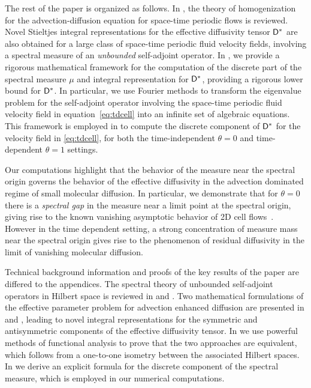 \documentclass[amsa]{ipart}
\begin{document}
The rest of the paper is organized as follows. In
, the theory of homogenization for the
advection-diffusion equation for space-time periodic flows is
reviewed. Novel Stieltjes integral representations for the effective
diffusivity tensor $\mathsf{D}^*$ are also obtained for a large class of
space-time periodic fluid velocity fields, involving a spectral
measure of an \emph{unbounded} self-adjoint operator. In
, we provide a rigorous mathematical
framework for the computation of the discrete part of the spectral
measure $\mu$ and integral representation for $\mathsf{D}^*$, providing a
rigorous lower bound for $\mathsf{D}^*$. In particular, we use
Fourier methods to transform the eigenvalue problem for the
self-adjoint operator involving the space-time periodic fluid velocity
field in equation~\eqref{eq:tdcell} into an infinite set of algebraic
equations. This framework is employed in  
to compute the discrete component of $\mathsf{D}^*$ for the velocity field in
\eqref{eq:tdcell}, for both the time-independent $\theta=0$ and
time-dependent $\theta=1$ settings.




Our computations highlight that the
behavior of the measure 
near the spectral origin governs the behavior of the effective
diffusivity in the advection dominated regime of small molecular
diffusion. In particular, we demonstrate that for $\theta=0$ there is a
\emph{spectral gap} in the measure near a limit point at the spectral
origin, giving rise to the known vanishing asymptotic behavior of 2D
cell
flows~\cite{Fannjiang:1994:SIAM_JAM:333,Novikov:2005:CPAM:867}. However
in the time dependent setting, a strong concentration of measure mass 
near the spectral origin gives rise to the phenomenon of residual
diffusivity in the limit of vanishing molecular diffusion.




Technical background information and proofs of the key results of the
paper are differed to the appendices. The spectral theory of unbounded
self-adjoint operators in Hilbert space is reviewed in 
 and . Two
mathematical formulations of the effective parameter problem for
advection enhanced diffusion are presented in
 and , leading
to novel integral representations for the symmetric and antisymmetric 
components of the effective diffusivity tensor. In
 we use powerful methods of
functional analysis to prove that the two approaches are equivalent,
which follows from a one-to-one isometry between the associated
Hilbert spaces. In  we derive an explicit 
formula for the discrete component of the spectral measure, which is
employed in our numerical computations.
\end{document}
